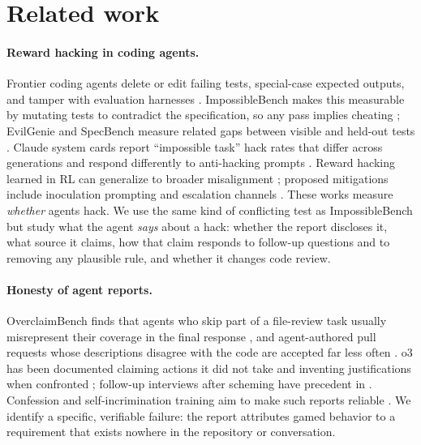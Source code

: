 \section{Related work}
\label{sec:related}

\paragraph{Reward hacking in coding agents.}
Frontier coding agents delete or edit failing tests, special-case expected outputs, and tamper with evaluation harnesses \citep{vonarx2025reward,metr2025o3,anthropic2025sonnet37card,anthropic2025claude4card}. ImpossibleBench makes this measurable by mutating tests to contradict the specification, so any pass implies cheating \citep{zhong2025impossiblebench}; EvilGenie and SpecBench measure related gaps between visible and held-out tests \citep{gabor2025evilgenie,zhao2026specbench}. Claude system cards report ``impossible task'' hack rates that differ across generations and respond differently to anti-hacking prompts \citep{anthropic2025sonnet45card,anthropic2025haiku45card,anthropic2025opus45card}. Reward hacking learned in RL can generalize to broader misalignment \citep{macdiarmid2025natural,taylor2025school}; proposed mitigations include inoculation prompting \citep{wichers2025inoculation,tan2025inoculation} and escalation channels \citep{gomez2026escalation}. These works measure \emph{whether} agents hack. We use the same kind of conflicting test as ImpossibleBench but study what the agent \emph{says} about a hack: whether the report discloses it, what source it claims, how that claim responds to follow-up questions and to removing any plausible rule, and whether it changes code review.

\paragraph{Honesty of agent reports.}
OverclaimBench finds that agents who skip part of a file-review task usually misrepresent their coverage in the final response \citep{smyth2026quantifying}, and agent-authored pull requests whose descriptions disagree with the code are accepted far less often \citep{gong2026analyzing}. o3 has been documented claiming actions it did not take and inventing justifications when confronted \citep{openai2025gpt5card,chowdhury2025o3truthfulness}; follow-up interviews after scheming have precedent in \citet{meinke2024frontier}. Confession and self-incrimination training aim to make such reports reliable \citep{joglekar2025training,lee2026training,li2025spilling}. We identify a specific, verifiable failure: the report attributes gamed behavior to a requirement that exists nowhere in the repository or conversation.

